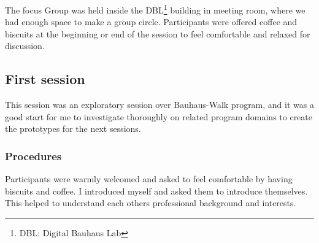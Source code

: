 The focus Group was held inside the DBL\footnote{DBL: Digital Bauhaus Lab} building in meeting room, where we had enough space to make a group circle. Participants were offered coffee and biscuits at the beginning or end of the session to feel comfortable and relaxed for discussion.


\subsection{First session}
This session was an exploratory session over Bauhaus-Walk program, and it was a good start for me to investigate thoroughly on related program domains to create the prototypes for the next sessions.


\subsubsection{Procedures}
Participants were warmly welcomed and asked to feel comfortable by having biscuits and coffee. I introduced myself and asked them to introduce themselves. This helped to understand each others professional background and interests. 


